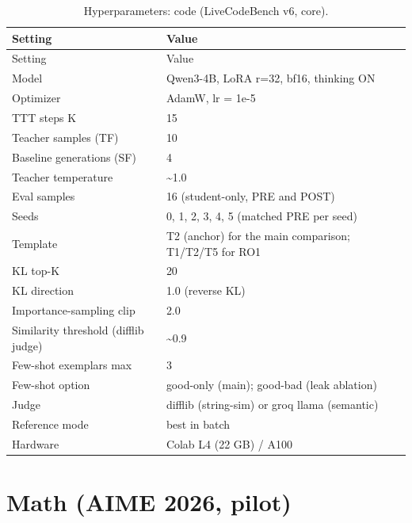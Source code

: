 \documentclass[12pt,a4paper]{report}
\begin{document}
\begingroup\setlength{\tabcolsep}{3pt}
\begin{longtable}{ll}
\caption{Hyperparameters: code (LiveCodeBench v6, core).}\\
\toprule
Setting & Value \\
\midrule
\endfirsthead
\toprule
Setting & Value \\
\midrule
\endhead
\bottomrule
\endfoot
Model & Qwen3-4B, LoRA r=32, bf16, thinking ON \\
Optimizer & AdamW, lr = 1e-5 \\
TTT steps K & 15 \\
Teacher samples (TF) & 10 \\
Baseline generations (SF) & 4 \\
Teacher temperature & \textasciitilde1.0 \\
Eval samples & 16 (student-only, PRE and POST) \\
Seeds & 0, 1, 2, 3, 4, 5 (matched PRE per seed) \\
Template & T2 (anchor) for the main comparison; T1/T2/T5 for RO1 \\
KL top-K & 20 \\
KL direction & 1.0 (reverse KL) \\
Importance-sampling clip & 2.0 \\
Similarity threshold (difflib judge) & \textasciitilde0.9 \\
Few-shot exemplars max & 3 \\
Few-shot option & good-only (main); good-bad (leak ablation) \\
Judge & difflib (string-sim) or groq llama (semantic) \\
Reference mode & best in batch \\
Hardware & Colab L4 (22 GB) / A100 \\
\end{longtable}\endgroup

\section{Math (AIME 2026, pilot)}\label{a.2-math-aime-2026-pilot}
\end{document}
